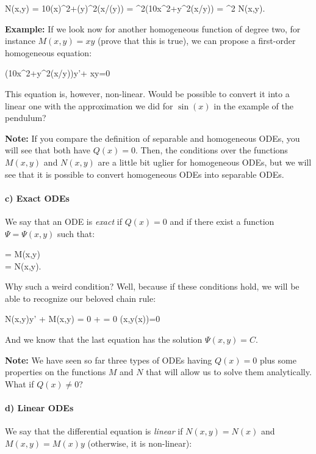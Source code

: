 \bnn  N(\lambda x,\lambda y) = 10(\lambda x)^2+(\lambda y)^2\sin(\lambda x/(\lambda y)) = \lambda^2(10x^2+y^2\sin(x/y)) = \lambda^2 N(x,y). \enn

{\bf Example:}  If we look now for another homogeneous function of degree two, for instance $M(x,y)=xy$ (prove that this is true), we can propose a first-order homogeneous equation:

\bnn (10x^2+y^2\sin(x/y))y'+ xy=0 \enn

This equation is, however, non-linear. Would be possible to convert it into a linear one with the approximation we did for $\sin(x)$ in the example of the pendulum?

{\bf Note:} If you compare the definition of separable and homogeneous ODEs, you will see that both have $Q(x)=0$. Then, the conditions over the functions $M(x,y)$ and $N(x,y)$ are a little bit uglier for homogeneous ODEs, but we will see that it is possible to convert homogeneous ODEs into separable ODEs.


    
\paragraph{c) Exact ODEs}

We say that an ODE is {\em exact} if $Q(x)=0$ and if there exist a function $\Psi=\Psi(x,y)$ such that:


\bnn 
	= M(x,y) \\
	= N(x,y). 
\enn

Why such a weird condition? Well, because if these conditions hold, we will be able to recognize
our beloved chain rule:

\bnn N(x,y)y' + M(x,y) = 0 \rightarrow {} +    = 0 \rightarrow {}\Psi(x,y(x))=0 \enn

And we know that the last equation has the solution $\Psi(x,y) = C$. 

{\bf Note: } We have seen so far three types of ODEs having $Q(x)=0$ plus some properties on the functions $M$ and $N$ that will allow us to solve them analytically. What if $Q(x)\neq 0$?


\paragraph{d) Linear ODEs}


We say that the differential equation is {\em linear} if $N(x,y)=N(x)$ and $M(x,y)=M(x)y$ (otherwise, it is non-linear):

